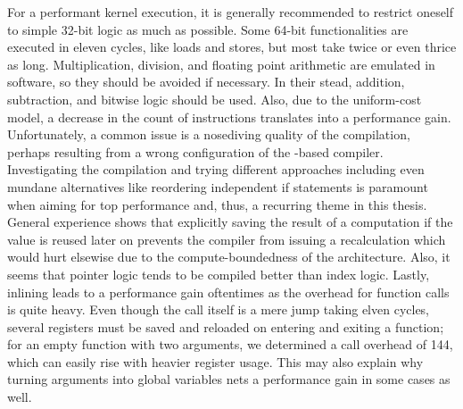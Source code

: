 For a performant kernel execution, it is generally recommended to restrict oneself to simple 32-bit logic as much as possible.
Some 64-bit functionalities are executed in eleven cycles, like loads and stores, but most take twice or even thrice as long.
Multiplication, division, and floating point arithmetic are emulated in software, so they should be avoided if necessary.
In their stead, addition, subtraction, and bitwise logic should be used.
Also, due to the uniform-cost model, a decrease in the count of instructions translates into a performance gain.
Unfortunately, a common issue is a nosediving quality of the compilation, perhaps resulting from a wrong configuration of the -based compiler.
Investigating the compilation and trying different approaches \Dash including even mundane alternatives like reordering independent if statements \Dash is paramount when aiming for top performance and, thus, a recurring theme in this thesis.
General experience shows that explicitly saving the result of a computation if the value is reused later on prevents the compiler from issuing a recalculation which would hurt elsewise due to the compute-boundedness of the architecture.
Also, it seems that pointer logic tends to be compiled better than index logic.
Lastly, inlining leads to a performance gain oftentimes as the overhead for function calls is quite heavy.
Even though the call itself is a mere jump taking elven cycles, several registers must be saved and reloaded on entering and exiting a function;
for an empty function with two arguments, we determined a call overhead of \qty{144}{\cycles}, which can easily rise with heavier register usage.
This may also explain why turning arguments into global variables nets a performance gain in some cases as well.
